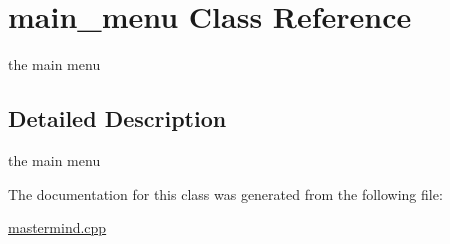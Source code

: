\hypertarget{classmain__menu}{\section{main\-\_\-menu Class Reference}
\label{classmain__menu}
}


the main menu  




\subsection{Detailed Description}
the main menu 

The documentation for this class was generated from the following file\-:\begin{DoxyCompactItemize}
\item 
\hyperlink{mastermind_8cpp}{mastermind.\-cpp}\end{DoxyCompactItemize}
